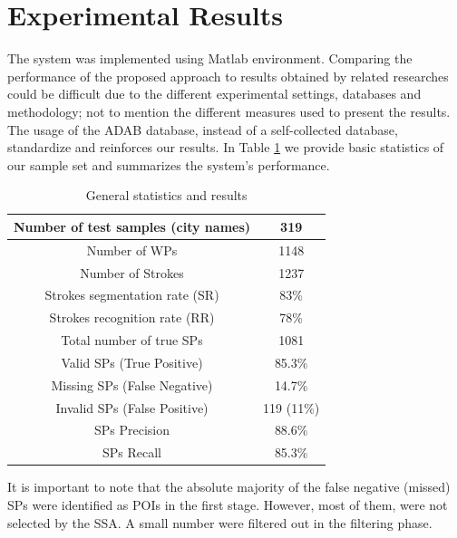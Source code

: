 \documentclass[10pt, conference, compsocconf]{IEEEtran}
\begin{document}

\section{Experimental Results}
\label{sec:results}
The system was implemented using Matlab environment. 
Comparing the performance of the proposed approach to results obtained by related researches could be difficult due to the different experimental settings, databases and methodology; not to mention the different measures used to present the results. 
The usage of the ADAB database, instead of a self-collected database, standardize and reinforces our results. 
In Table \ref{table:general_stats_results} we provide basic statistics of our sample set and summarizes the system's performance.

\begin{table}[h]
\caption{General statistics and results}
\renewcommand{\arraystretch}{1.2}
\begin{tabular}{ | c | c | }
  \hline
  Number of test samples (city names) & 319 \\
  \hline
  Number of WPs & 1148 \\
  \hline
  Number of Strokes & 1237 \\
  \hline
  Strokes segmentation rate (SR) &  83\% \\ 
  \hline
  Strokes recognition rate (RR) &  78\% \\ 
 \hline
  Total number of true SPs & 1081 \\
  \hline
  Valid SPs (True Positive) & 85.3\% \\
    \hline
  Missing SPs (False Negative) & 14.7\% \\
  \hline
  Invalid SPs (False Positive) & 119 (11\%) \\
  \hline                                    
  SPs Precision & 88.6\% \\ 
 \hline
  SPs Recall &  85.3\% \\ 
  \hline
\end{tabular}
\centering
\label{table:general_stats_results} 
\end{table}

It is important to note that the absolute majority of the false negative (missed) SPs were identified as POIs in the first stage.
However, most of them, were not selected by the SSA.
A small number were filtered out in the filtering phase. 
\end{document}
